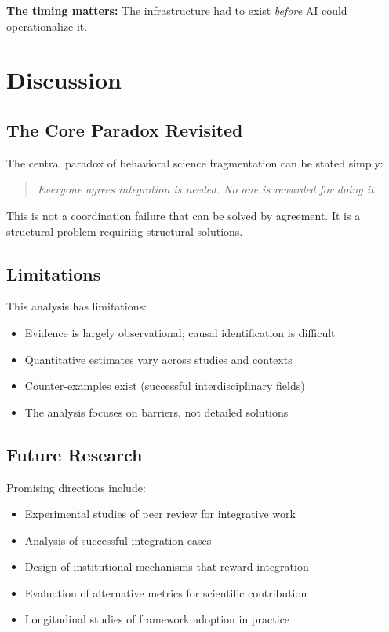 \documentclass[12pt,a4paper]{article}
\begin{document}
\textbf{The timing matters:} The infrastructure had to exist \emph{before} AI could operationalize it.

\section{Discussion}
\label{sec:discussion}

\subsection{The Core Paradox Revisited}

The central paradox of behavioral science fragmentation can be stated simply:

\begin{quote}
\textit{Everyone agrees integration is needed. No one is rewarded for doing it.}
\end{quote}

This is not a coordination failure that can be solved by agreement. It is a structural problem requiring structural solutions.

\subsection{Limitations}

This analysis has limitations:
\begin{itemize}[nosep]
\item Evidence is largely observational; causal identification is difficult
\item Quantitative estimates vary across studies and contexts
\item Counter-examples exist (successful interdisciplinary fields)
\item The analysis focuses on barriers, not detailed solutions
\end{itemize}

\subsection{Future Research}

Promising directions include:
\begin{itemize}[nosep]
\item Experimental studies of peer review for integrative work
\item Analysis of successful integration cases
\item Design of institutional mechanisms that reward integration
\item Evaluation of alternative metrics for scientific contribution
\item Longitudinal studies of framework adoption in practice
\end{itemize}
\end{document}
